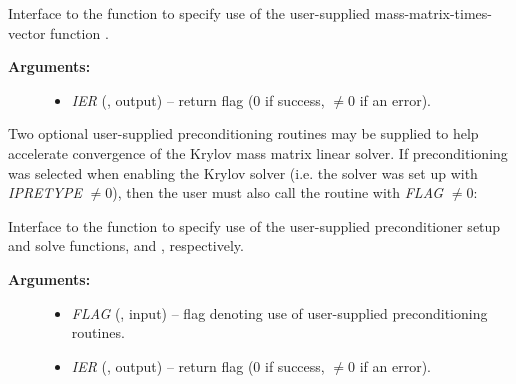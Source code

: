 \documentclass[letterpaper,10pt,english]{sphinxmanual}
\begin{document}
\begin{fulllineitems}
\label{f_interface/Usage:f/_/FARKSPILSSETMASS}
Interface to the function {\hyperref[c_interface/User_callable:c.ARKSpilsSetMassTimesVecFn]{\emph{}}} to
specify use of the user-supplied mass-matrix-times-vector function
{\hyperref[f_interface/Usage:f/_/FARKMTIMES]{\emph{}}}.
\begin{description}
\item[{\textbf{Arguments:}}] \leavevmode\begin{itemize}
\item {} 
\emph{IER}  (, output) -- return flag  (0 if success,
\(\ne 0\) if an error).

\end{itemize}

\end{description}

\end{fulllineitems}


Two optional user-supplied preconditioning routines may be supplied to
help accelerate convergence of the Krylov mass matrix linear solver.
If preconditioning was selected when enabling the Krylov solver
(i.e. the solver was set up with \emph{IPRETYPE} \(\ne 0\)), then the
user must also call the routine {\hyperref[f_interface/Usage:f/_/FARKSPILSSETMASSPREC]{\emph{}}} with
\emph{FLAG} \(\ne 0\):

\begin{fulllineitems}
\label{f_interface/Usage:f/_/FARKSPILSSETMASSPREC}
Interface to the function {\hyperref[c_interface/User_callable:c.ARKSpilsSetMassPreconditioner]{\emph{}}} to
specify use of the user-supplied preconditioner setup and solve
functions, {\hyperref[f_interface/Usage:f/_/FARKMASSPSET]{\emph{}}} and {\hyperref[f_interface/Usage:f/_/FARKMASSPSOL]{\emph{}}},
respectively.
\begin{description}
\item[{\textbf{Arguments:}}] \leavevmode\begin{itemize}
\item {} 
\emph{FLAG} (, input) -- flag denoting use of user-supplied
preconditioning routines.

\item {} 
\emph{IER}  (, output) -- return flag  (0 if success,
\(\ne 0\) if an error).

\end{itemize}

\end{description}

\end{fulllineitems}
\end{document}
